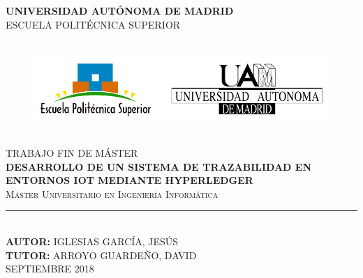 \documentclass[12pt,a4paper, twoside]{report}
\newcommand{\university}{UNIVERSIDAD AUTÓNOMA DE MADRID}
\newcommand{\faculty}{ESCUELA POLITÉCNICA SUPERIOR}
\newcommand{\master}{Máster Universitario en Ingeniería Informática}
\newcommand{\tfm}{TRABAJO FIN DE MÁSTER}
\newcommand{\titleTFM}{DESARROLLO DE UN SISTEMA DE TRAZABILIDAD EN ENTORNOS IOT MEDIANTE HYPERLEDGER}
\newcommand{\jesus}{IGLESIAS GARCÍA, JESÚS}
\newcommand{\david}{ARROYO GUARDEÑO, DAVID}
\begin{document}
	
	\begin{titlepage}
		\begin{center}
			\vspace*{0.5in}	

			\Large{\textbf{\university}}\\	
			\vspace*{0.2in}
			\large{\textsc{\faculty}}\\
			\vspace*{0.5in}
			
			\begin{figure}[htb]
				\begin{center}
					\includegraphics[width=17cm, height=3.5cm]{Images/eps_uam}
				\end{center}
			\end{figure}
			\vspace*{0.6in}
			\Large{\textsc{\tfm}}\\
			\vspace*{0.35in}
			\Large{\textbf{\titleTFM}} \\
			\vspace*{0.8in}
			\large{\textsc{\master}}\\
			\vspace*{0.1in}
			\rule{100mm}{0.3mm}\\ %
			\vspace*{0.5in}
			\normalsize{\textbf{AUTOR:}} \normalsize{\jesus}  \\
			\vspace*{0.1in}
			\normalsize{\textbf{TUTOR:}} \normalsize{\david} \\
			\vspace*{0.4in}
			\large{SEPTIEMBRE 2018} \\
		\end{center}
	\end{titlepage}
	
	\thispagestyle{empty}
	\mbox{}
	\vfill
	
\end{document}
